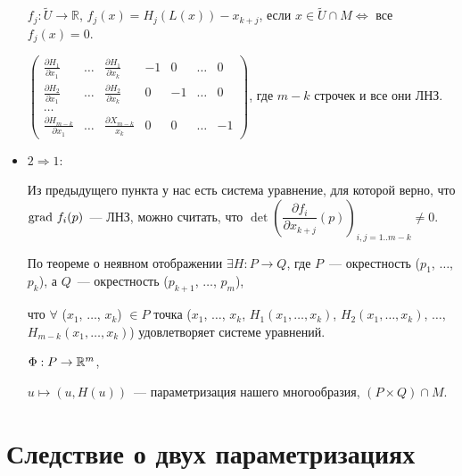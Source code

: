 \documentclass{article}
\begin{document}
\begin{itemize}
                        $f_j : \widetilde{U} \rightarrow \mathbb{R}$, $f_j(x) = H_j \left( L(x) \right) - x_{k + j}$, если $x \in \widetilde{U} \cap M \Leftrightarrow$ все $f_j(x) = 0$.
                        
                        $\begin{pmatrix} \frac{\partial H_1}{\partial x_1} & \ldots & \frac{\partial H_1}{\partial x_k} & -1 & 0 & \ldots & 0 \\ \frac{\partial H_2}{\partial x_1} & \ldots & \frac{\partial H_2}{\partial x_k} & 0 & -1 & \ldots & 0 \\ \ldots \\ \frac{\partial H_{m - k}}{\partial x_1} & \ldots & \frac{\partial X_{m - k}}{x_k} & 0 & 0 & \ldots & -1 \end{pmatrix}$, где $m - k$ строчек и все они ЛНЗ.
                        
                    \item $2 \Rightarrow 1$:
                    
                        Из предыдущего пункта у нас есть система уравнение, для которой верно, что $\grad f_i(p)$~--- ЛНЗ, можно считать, что $\det \left( \dfrac{\partial f_i}{\partial x_{k + j}} (p) \right)_{i, j = 1 .. m - k} \neq 0$.
                        
                        По теореме о неявном отображении $\exists H : P \rightarrow Q$, где $P$~--- окрестность ($p_1$, $\ldots$, $p_k$), а $Q$~--- окрестность ($p_{k + 1}$, $\ldots$, $p_m$),
                        
                        что $\forall$ ($x_1$, $\ldots$, $x_k$) $\in P$ точка ($x_1$, $\ldots$, $x_k$, $H_1(x_1, \ldots, x_k)$, $H_2(x_1, \ldots, x_k)$, $\ldots$, $H_{m - k}(x_1, \ldots, x_k)$) удовлетворяет системе уравнений.
                        
                        $\Phi : P \rightarrow \mathbb{R}^m$,
                        
                        $u \mapsto (u, H(u))$~--- параметризация нашего многообразия, $\left( P \times Q \right) \cap M$.
                        
                \end{itemize}
                
    \newpage
    
    \section{Следствие о двух параметризациях}
    
\end{document}
